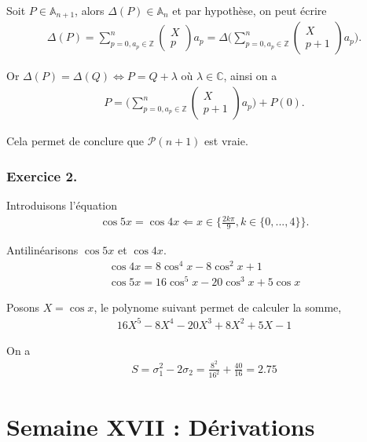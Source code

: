 \documentclass{article}
\begin{document}
\begin{enumerate}
Soit $P\in\mathbb{A}_{n+1}$, alors $\Delta(P)\in\mathbb{A}_n$ et par hypothèse, on peut écrire
\begin{align*}
\Delta(P) = \sum_{p=0, a_p\in\mathbb{Z}}^{n}\begin{pmatrix}X\\p\end{pmatrix}a_p = \Delta\bigg(\sum_{p=0, a_p\in\mathbb{Z}}^{n}\begin{pmatrix}X\\p+1\end{pmatrix}a_p\bigg).
\end{align*}

Or $\Delta(P)=\Delta(Q)\Longleftrightarrow P = Q+\lambda$ où $\lambda\in\mathbb{C}$, ainsi on a 
\begin{align*}
P =\bigg( \sum_{p=0, a_p\in\mathbb{Z}}^{n}\begin{pmatrix}X\\p+1\end{pmatrix}a_p\bigg) + P(0).
\end{align*}

Cela permet de conclure que $\mathcal{P}(n+1)$ est vraie. 

\end{enumerate}
\subsubsection*{Exercice 2.}
Introduisons l'équation 
\begin{align*}
\cos{5x}=\cos{4x} \Leftarrow x\in \{\frac{2k\pi}{9},k\in\{0,...,4\}\}.
\end{align*}

Antilinéarisons $\cos{5x}$ et $\cos{4x}$.
\begin{align*}
\cos{4x}=8 \cos^4{x} - 8 \cos^2{x} + 1\\
\cos{5x}=16 \cos^5{x} - 20 \cos^3{x} + 5\cos{x}
\end{align*}

Posons $X =\cos{x}$, le polynome suivant permet de calculer la somme,
\begin{align*}
16X^5-8X^4-20X^3+8X^2+5X-1
\end{align*}

On a
\begin{align*}
S = \sigma_1^2-2\sigma_2 = \frac{8^2}{16^2}+\frac{40}{16}=2.75
\end{align*}

\section{Semaine XVII : Dérivations}
\end{document}
